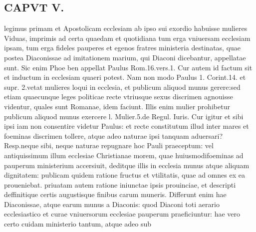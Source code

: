 \documentclass{article}
\begin{document}
\begin{pages}
\section*{CAPVT V. }
\marginpar{[ p.271 ]}\pstart legimus primam et Apostolicam ecclesiam ab ipso sui exordio habuisse mulieres Viduas, imprimis ad certa quaedam et quotidiana tum erga vniuersam ecclesiam ipsam, tum erga fideles pauperes et egenos fratres ministeria destinatas, quae postea Diaconissae ad imitationem marium, qui Diaconi dicebantur, appellatae sunt. Sic enim Phoe ben appellat Paulus Rom.16.vers.1. Cur autem id factum sit et inductum in ecclesiam quaeri potest. Nam non modo Paulus 1. Corint.14. et supr. 2.vetat mulieres loqui in ecclesia, et publicum aliquod munus gerere:sed etiam quaecunque leges politicae recte vtriusque sexus discrimen agnouisse videntur, quales sunt Romanae, idem faciunt. Illis enim mulier prohibetur publicum aliquod munus exercere l. Mulier.5.de Regul. Iuris. Cur igitur et sibi ipsi iam non consentire videtur Paulus: et recte constitutum illud inter mares et foeminas discrimen tollere, atque adeo naturae ipsi tanquam aduersari? Resp.neque sibi, neque naturae repugnare hoc Pauli praeceptum: vel antiquissimum illum ecclesiae Christianae morem, quae huiusmodifoeminas ad pauperum ministerium accersiuit, deditque illis in ecclesia munus atque aliquam dignitatem: publicam quidem ratione fructus et vtilitatis, quae ad omnes ex ea proueniebat. priuatam autem ratione iniunctae ipsis prouinciae, et descripti deffinitique certis augustisque finibus carum muneris. Differunt enim hae Diaconissae, atque earum munus a Diaconis: quod Diaconi toti aerario ecclesiastico et curae vniuersorum ecclesiae pauperum praeficiuntur: hae vero certo cuidam ministerio tantum, atque adeo sub  \pend

\end{pages}
\end{document}
